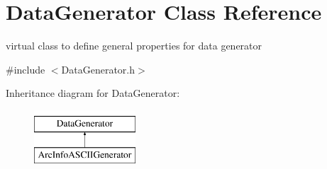 \hypertarget{classDataGenerator}{\section{\-Data\-Generator \-Class \-Reference}
\label{classDataGenerator}
}


virtual class to define general properties for data generator  




{\ttfamily \#include $<$\-Data\-Generator.\-h$>$}

\-Inheritance diagram for \-Data\-Generator\-:\begin{figure}[H]
\begin{center}
\leavevmode
\includegraphics[height=2.000000cm]{classDataGenerator}
\end{center}
\end{figure}
